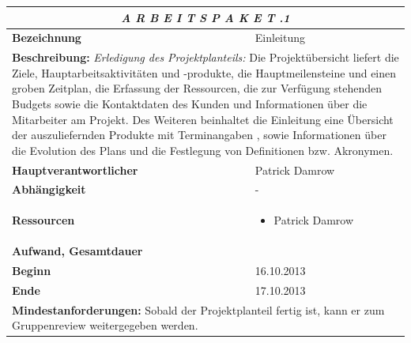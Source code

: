 \documentclass[fontsize=12pt,paper=a4,twoside]{scrartcl}
\begin{document}
\begin{tabular}{p{7.5cm}|p{7.5cm}}\toprule
\multicolumn{2}{c}{\textbf{\textit{A R B E I T S P A K E T \quad 1.1.1}}} \\ \toprule \hline
\textbf{Bezeichnung} & Einleitung\\\hline
\multicolumn{2}{p{15cm}}{\textbf{Beschreibung:} \newline 
\textit{Erledigung des Projektplanteils:} Die Projektübersicht liefert die Ziele, Hauptarbeitsaktivitäten und -produkte, die Hauptmeilensteine und einen groben Zeitplan, die Erfassung der Ressourcen, die zur Verfügung stehenden Budgets sowie die Kontaktdaten des Kunden und Informationen über die Mitarbeiter am Projekt. Des Weiteren beinhaltet die Einleitung eine Übersicht der auszuliefernden  Produkte mit Terminangaben , sowie Informationen über die Evolution des Plans und die Festlegung von Definitionen bzw. Akronymen.}  \\\hline
\textbf{Hauptverantwortlicher} & Patrick Damrow\\\hline
\textbf{Abhängigkeit} & -\\\hline
\textbf{Ressourcen} & \begin{itemize}
\itemsep0pt
\item Patrick Damrow
\end{itemize} \\\hline
\textbf{Aufwand, Gesamtdauer} & \\\hline
\textbf{Beginn} & 16.10.2013 \\\hline
\textbf{Ende} & 17.10.2013\\\hline
\multicolumn{2}{p{15cm}}{\textbf{Mindestanforderungen: } \newline
Sobald der Projektplanteil fertig ist, kann er zum Gruppenreview weitergegeben werden. }  \\ \toprule
\end{tabular} \\\\
\end{document}
